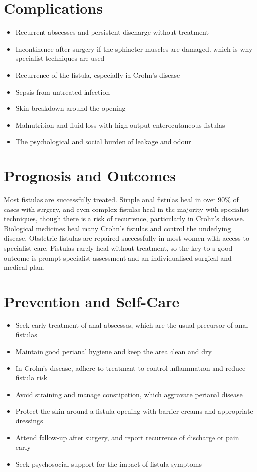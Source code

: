 \section*{Complications}
\begin{itemize}
    \item Recurrent abscesses and persistent discharge without treatment
    \item Incontinence after surgery if the sphincter muscles are damaged, which is why specialist techniques are used
    \item Recurrence of the fistula, especially in Crohn's disease
    \item Sepsis from untreated infection
    \item Skin breakdown around the opening
    \item Malnutrition and fluid loss with high-output enterocutaneous fistulas
    \item The psychological and social burden of leakage and odour
\end{itemize}

\section*{Prognosis and Outcomes}
Most fistulas are successfully treated. Simple anal fistulas heal in over 90\% of cases with surgery, and even complex fistulas heal in the majority with specialist techniques, though there is a risk of recurrence, particularly in Crohn's disease. Biological medicines heal many Crohn's fistulas and control the underlying disease. Obstetric fistulas are repaired successfully in most women with access to specialist care. Fistulas rarely heal without treatment, so the key to a good outcome is prompt specialist assessment and an individualised surgical and medical plan.

\section*{Prevention and Self-Care}
\begin{itemize}
    \item Seek early treatment of anal abscesses, which are the usual precursor of anal fistulas
    \item Maintain good perianal hygiene and keep the area clean and dry
    \item In Crohn's disease, adhere to treatment to control inflammation and reduce fistula risk
    \item Avoid straining and manage constipation, which aggravate perianal disease
    \item Protect the skin around a fistula opening with barrier creams and appropriate dressings
    \item Attend follow-up after surgery, and report recurrence of discharge or pain early
    \item Seek psychosocial support for the impact of fistula symptoms
\end{itemize}

